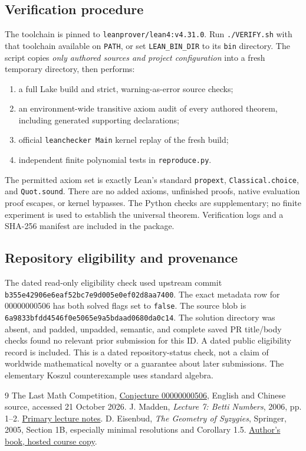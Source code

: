 \documentclass[11pt]{article}
\newcommand{\id}{00000000506}
\begin{document}
\subsection*{Verification procedure}
The toolchain is pinned to \texttt{leanprover/lean4:v4.31.0}. Run
\texttt{./VERIFY.sh} with that toolchain available on \texttt{PATH}, or set
\texttt{LEAN\_\allowbreak{}BIN\_\allowbreak{}DIR} to its \texttt{bin} directory. The script copies
\emph{only authored sources and project configuration} into a fresh temporary
directory, then performs:
\begin{enumerate}
\item a full Lake build and strict, warning-as-error source checks;
\item an environment-wide transitive axiom audit of every authored theorem,
including generated supporting declarations;
\item official \texttt{leanchecker Main} kernel replay of the fresh build;
\item independent finite polynomial tests in \texttt{reproduce.py}.
\end{enumerate}
The permitted axiom set is exactly Lean's standard
\texttt{propext}, \texttt{Classical.choice}, and \texttt{Quot.sound}.
There are no added axioms, unfinished proofs, native evaluation proof escapes,
or kernel bypasses. The Python checks are supplementary; no finite experiment
is used to establish the universal theorem. Verification logs and a SHA-256
manifest are included in the package.

\newpage
\subsection*{Repository eligibility and provenance}
The dated read-only eligibility check used upstream commit
\texttt{b355e42906e6eaf52bc7e\allowbreak{}9d005e0ef02d8aa7400}.
The exact metadata row for \id{} has both solved flags set to
\texttt{false}. The source blob is
\texttt{6a9833bfdd4546f0e506\allowbreak{}5e9a5bdaad0680da0c14}.
The solution directory was absent, and padded, unpadded, semantic, and complete
saved PR title/body checks found no relevant prior submission for this ID. A
dated public eligibility record is included. This is a dated repository-status check, not a claim of worldwide
mathematical novelty or a guarantee about later submissions. The elementary
Koszul counterexample uses standard algebra.

\begin{thebibliography}{9}
 The Last Math Competition,
\href{https://github.com/The-Last-Math-Competition/The-Last-Math-Competition/blob/b355e42906e6eaf52bc7e9d005e0ef02d8aa7400/conjectures/00000000506.md}{Conjecture \id},
English and Chinese source, accessed 21 October 2026.
 J. Madden, \emph{Lecture 7: Betti Numbers}, 2006, pp. 1--2.
\href{https://www.math.lsu.edu/~madden/M7290Fall2006/lecture7.pdf}{Primary lecture notes}.
 D. Eisenbud, \emph{The Geometry of Syzygies}, Springer, 2005,
Section 1B, especially minimal resolutions and Corollary 1.5.
\href{https://www-users.cse.umn.edu/~reiner/REU/REU2019notes/2005_Book_TheGeometryOfSyzygies.pdf}{Author's book, hosted course copy}.
\end{thebibliography}
\end{document}
